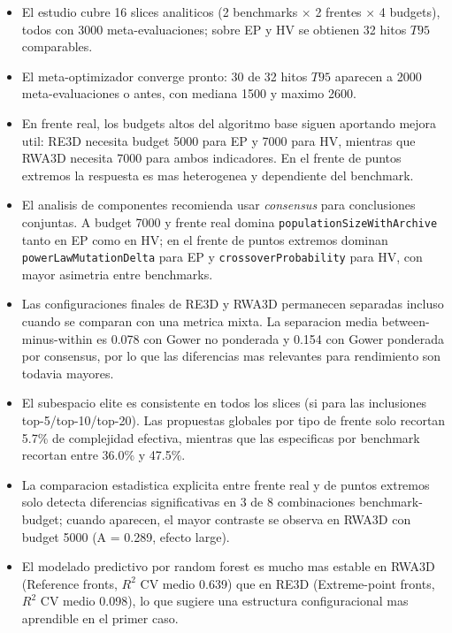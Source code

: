\documentclass[11pt,a4paper]{article}
\begin{document}

\begin{itemize}

\item El estudio cubre 16 slices analiticos (2 benchmarks $\times$ 2 frentes $\times$ 4 budgets), todos con 3000 meta-evaluaciones; sobre EP y HV se obtienen 32 hitos \(T95\) comparables.

\item El meta-optimizador converge pronto: 30 de 32 hitos \(T95\) aparecen a 2000 meta-evaluaciones o antes, con mediana 1500 y maximo 2600.

\item En frente real, los budgets altos del algoritmo base siguen aportando mejora util: RE3D necesita budget 5000 para EP y 7000 para HV, mientras que RWA3D necesita 7000 para ambos indicadores. En el frente de puntos extremos la respuesta es mas heterogenea y dependiente del benchmark.

\item El analisis de componentes recomienda usar \emph{consensus} para conclusiones conjuntas. A budget 7000 y frente real domina \texttt{populationSizeWithArchive} tanto en EP como en HV; en el frente de puntos extremos dominan \texttt{powerLawMutationDelta} para EP y \texttt{crossoverProbability} para HV, con mayor asimetria entre benchmarks.

\item Las configuraciones finales de RE3D y RWA3D permanecen separadas incluso cuando se comparan con una metrica mixta. La separacion media between-minus-within es 0.078 con Gower no ponderada y 0.154 con Gower ponderada por consensus, por lo que las diferencias mas relevantes para rendimiento son todavia mayores.

\item El subespacio elite es consistente en todos los slices (si para las inclusiones top-5/top-10/top-20). Las propuestas globales por tipo de frente solo recortan 5.7\% de complejidad efectiva, mientras que las especificas por benchmark recortan entre 36.0\% y 47.5\%.

\item La comparacion estadistica explicita entre frente real y de puntos extremos solo detecta diferencias significativas en 3 de 8 combinaciones benchmark-budget; cuando aparecen, el mayor contraste se observa en RWA3D con budget 5000 (A = 0.289, efecto large).

\item El modelado predictivo por random forest es mucho mas estable en RWA3D (Reference fronts, $R^2$ CV medio 0.639) que en RE3D (Extreme-point fronts, $R^2$ CV medio 0.098), lo que sugiere una estructura configuracional mas aprendible en el primer caso.


\end{itemize}
\end{document}
